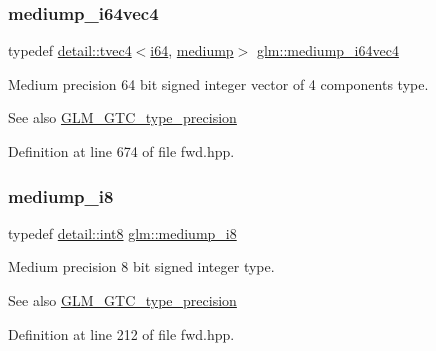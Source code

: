 \subsubsection{\texorpdfstring{mediump\+\_\+i64vec4}{mediump\_i64vec4}}
{\footnotesize\ttfamily typedef \hyperlink{structglm_1_1detail_1_1tvec4}{detail\+::tvec4}$<$\hyperlink{group__gtc__type__precision_gac7a7eaad46064fc952b06df33689da23}{i64}, \hyperlink{namespaceglm_a0f04f086094c747d227af4425893f545a6416f3ea0c9025fb21ed50c4d6620482}{mediump}$>$ \hyperlink{group__gtc__type__precision_gab4db11ebb425fa18fe5d15d455c360a3}{glm\+::mediump\+\_\+i64vec4}}

Medium precision 64 bit signed integer vector of 4 components type. \begin{DoxySeeAlso}{See also}
\hyperlink{group__gtc__type__precision}{G\+L\+M\+\_\+\+G\+T\+C\+\_\+type\+\_\+precision} 
\end{DoxySeeAlso}


Definition at line 674 of file fwd.\+hpp.

\mbox{\label{group__gtc__type__precision_ga28a8b5fd51072680bb55178c17cc7411}} 
\subsubsection{\texorpdfstring{mediump\+\_\+i8}{mediump\_i8}}
{\footnotesize\ttfamily typedef \hyperlink{namespaceglm_1_1detail_a04b526a8d7a9b455602a0afa78c531e0}{detail\+::int8} \hyperlink{group__gtc__type__precision_ga28a8b5fd51072680bb55178c17cc7411}{glm\+::mediump\+\_\+i8}}

Medium precision 8 bit signed integer type. \begin{DoxySeeAlso}{See also}
\hyperlink{group__gtc__type__precision}{G\+L\+M\+\_\+\+G\+T\+C\+\_\+type\+\_\+precision} 
\end{DoxySeeAlso}


Definition at line 212 of file fwd.\+hpp.

\mbox{\label{group__gtc__type__precision_ga820f8b497e06d518968d00761747c547}} 
